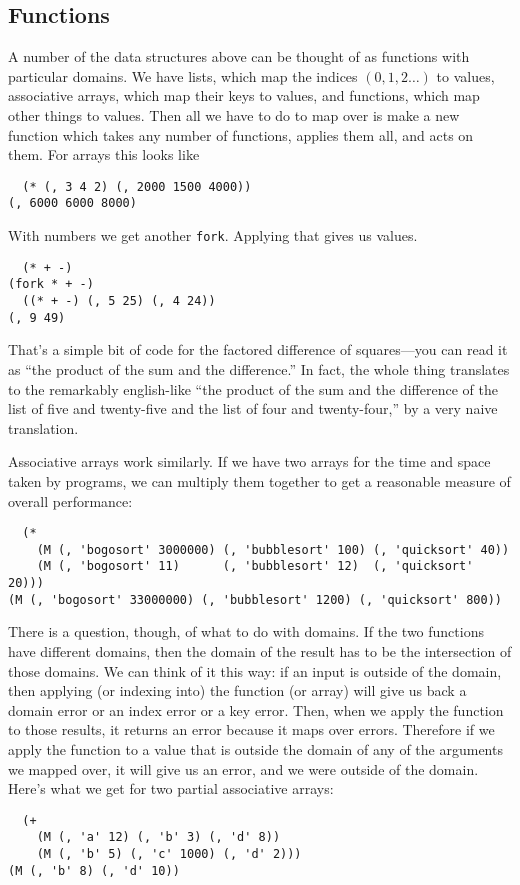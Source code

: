 \documentclass{article}
\newcommand{\code}[1]{\lstinline`#1`}
\begin{document}
\subsection{Functions}
A number of the data structures above can be thought of as functions with particular domains. We have lists, which map the indices $(0, 1, 2\ldots)$ to values, associative arrays, which map their keys to values, and functions, which map other things to values. Then all we have to do to map over is make a new function which takes any number of functions, applies them all, and acts on them. For arrays this looks like
\begin{lstlisting}
  (* (, 3 4 2) (, 2000 1500 4000))
(, 6000 6000 8000)
\end{lstlisting}
With numbers we get another \code{fork}. Applying that gives us values.
\begin{lstlisting}
  (* + -)
(fork * + -)
  ((* + -) (, 5 25) (, 4 24))
(, 9 49)
\end{lstlisting}
That's a simple bit of code for the factored difference of squares---you can read it as ``the product of the sum and the difference.'' In fact, the whole thing translates to the remarkably english-like ``the product of the sum and the difference of the list of five and twenty-five and the list of four and twenty-four,'' by a very naive translation.

Associative arrays work similarly. If we have two arrays for the time and space taken by programs, we can multiply them together to get a reasonable measure of overall performance:
\begin{lstlisting}
  (*
    (M (, 'bogosort' 3000000) (, 'bubblesort' 100) (, 'quicksort' 40))
    (M (, 'bogosort' 11)      (, 'bubblesort' 12)  (, 'quicksort' 20)))
(M (, 'bogosort' 33000000) (, 'bubblesort' 1200) (, 'quicksort' 800))
\end{lstlisting}
There is a question, though, of what to do with domains. If the two functions have different domains, then the domain of the result has to be the intersection of those domains. We can think of it this way: if an input is outside of the domain, then applying (or indexing into) the function (or array) will give us back a domain error or an index error or a key error. Then, when we apply the function to those results, it returns an error because it maps over errors. Therefore if we apply the function to a value that is outside the domain of any of the arguments we mapped over, it will give us an error, and we were outside of the domain. Here's what we get for two partial associative arrays:
\begin{lstlisting}
  (+
    (M (, 'a' 12) (, 'b' 3) (, 'd' 8))
    (M (, 'b' 5) (, 'c' 1000) (, 'd' 2)))
(M (, 'b' 8) (, 'd' 10))
\end{lstlisting}
\end{document}
